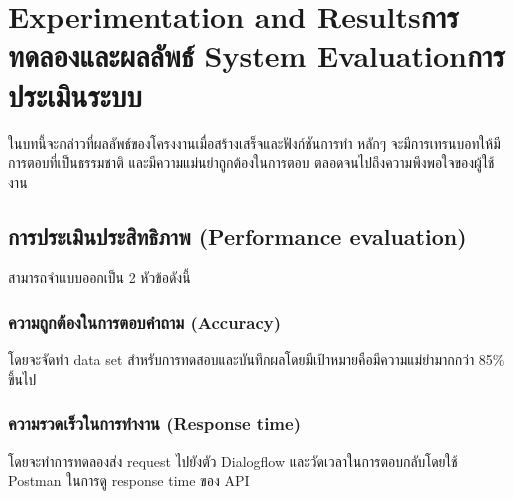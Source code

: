 \chapter{\ifproject%
\ifenglish Experimentation and Results\else การทดลองและผลลัพธ์\fi
\else%
\ifenglish System Evaluation\else การประเมินระบบ\fi
\fi}

ในบทนี้จะกล่าวที่ผลลัพธ์ของโครงงานเมื่อสร้างเสร็จและฟังก์ชันการทำ หลักๆ จะมีการเทรนบอทให้มี
การตอบที่เป็นธรรมชาติ และมีความแม่นยำถูกต้องในการตอบ ตลอดจนไปถึงความพึงพอใจของผู้ใช้งาน
\section{การประเมินประสิทธิภาพ (Performance evaluation)}
สามารถจำแบบออกเป็น 2 หัวข้อดังนี้
\subsection{ความถูกต้องในการตอบคำถาม (Accuracy)}
โดยจะจัดทำ data set สำหรับการทดสอบและบันทึกผลโดยมีเป้าหมายคือมีความแม่ยำมากกว่า 85\% ขึ้นไป

\subsection{ความรวดเร็วในการทำงาน (Response time)}
โดยจะทำการทดลองส่ง request ไปยังตัว Dialogflow และวัดเวลาในการตอบกลับโดยใช้ Postman ในการดู response time ของ API




